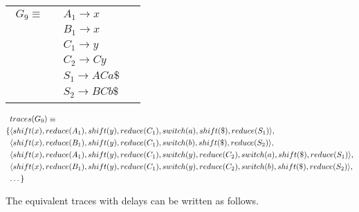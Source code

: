 \documentclass[envcountsame,runningheads]{llncs}
\begin{document}
\begin{tabular}[t]{cl}
\parbox{.3\textwidth}{
\begin{align*}
G_9 \equiv \quad & A_1 \rightarrow x\\
                 & B_1 \rightarrow x\\
                 & C_1 \rightarrow y\\
                 & C_2 \rightarrow C y\\
                 & S_1 \rightarrow A C a \$\\
                 & S_2 \rightarrow B C b \$
\end{align*}}
\parbox{.6\textwidth}{}
\end{tabular}

{\small\parbox{.3\textwidth}{\begin{align*}
&traces(G_9) \equiv \\
\{ & \langle shift(x), reduce(A_1), shift(y), reduce(C_1), switch(a), shift(\$), reduce(S_1) \rangle,\\
   & \langle shift(x), reduce(B_1), shift(y), reduce(C_1), switch(b), shift(\$), reduce(S_2) \rangle,\\
   & \langle shift(x), reduce(A_1), shift(y), reduce(C_1), switch(y), reduce(C_2), switch(a), shift(\$), reduce(S_1) \rangle,\\
   & \langle shift(x), reduce(B_1), shift(y), reduce(C_1), switch(y), reduce(C_2), switch(b), shift(\$), reduce(S_2) \rangle,\\
   & \textellipsis \}
\end{align*}}}

The equivalent traces with delays can be written as follows.
\end{document}
